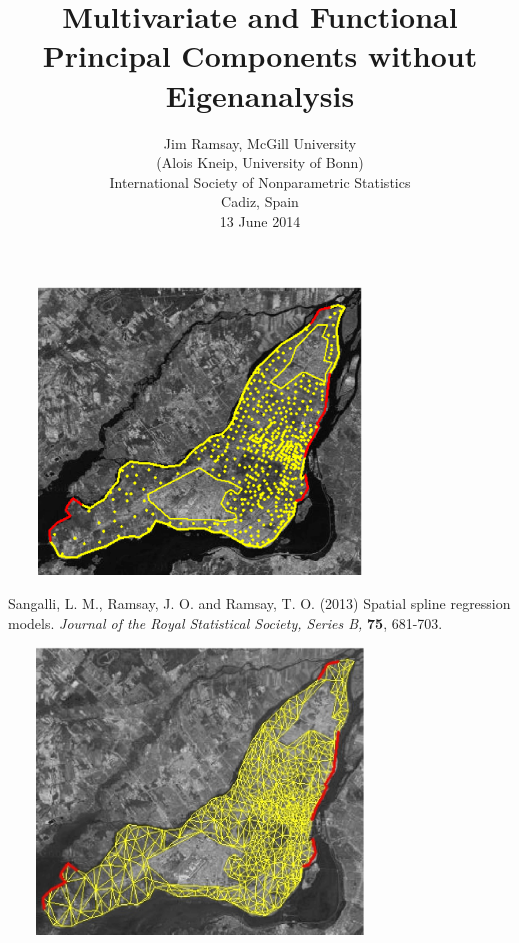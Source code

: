 \documentclass[11pt]{beamer}
\title{Multivariate and Functional Principal Components without Eigenanalysis}
\author{Jim Ramsay, McGill University \\
        (Alois Kneip, University of Bonn) \\
      International Society of Nonparametric Statistics \\
      Cadiz, Spain \\
      13 June 2014}
\date{}
\begin{document}
\begin{frame}

\maketitle

\end{frame}

\begin{frame}

\begin{center}
\includegraphics[height=3in, width=4in]{figs/Montreal_data_boundary_small.eps}
\end{center}

\end{frame}

\begin{frame}

Sangalli, L. M., Ramsay, J. O. and Ramsay, T. O. (2013) Spatial spline regression models. \emph{Journal of the Royal Statistical Society, Series B,} {\bf 75}, 681-703.

\end{frame}

\begin{frame}

\begin{center}
\includegraphics[height=3in, width=4in]{figs/fig_Montreal_triangulation_dirichlet_small.eps}
\end{center}

\end{frame}
\end{document}
